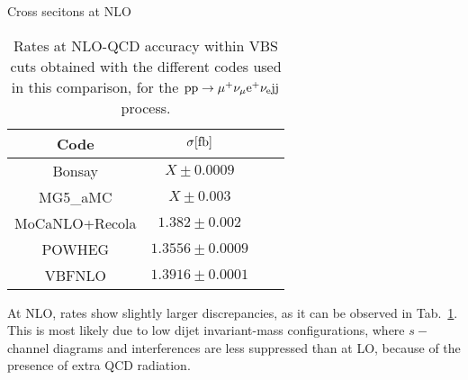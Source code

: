 Cross secitons at NLO

\begin{table}[h!]
    \centering
    \begin{tabular}{c|c|c|c}
        Code  &  $\sigma[\rm{fb}]$  \\
        \hline
        \hline
        {\sc Bonsay}  &  $X \pm 0.0009$  \\
        {\sc MG5\_aMC}&  $X  \pm 0.003$  \\
        {\sc MoCaNLO+Recola}  &  $ 1.382 \pm 0.002$ \\
        {\sc POWHEG}  &  $1.3556 \pm 0.0009$  \\
        {\sc VBFNLO}  &  $1.3916 \pm 0.0001$  \\
    \end{tabular}
    \caption{\label{tab:wg1_NLOrates} Rates at NLO-QCD accuracy within VBS cuts obtained with the different codes used in this comparison, 
    for the ${\rm p}{\rm p}\to\mu^+\nu_\mu{\rm e}^+\nu_{\rm e}{\rm j}{\rm j}$ process.}
\end{table}
At NLO, rates show slightly larger discrepancies, as it can be observed in Tab.~\ref{tab:wg1_NLOrates}. This is most likely due to low dijet invariant-mass configurations, where
$s-$channel diagrams and interferences are less suppressed than at LO, because of the presence of extra QCD radiation.